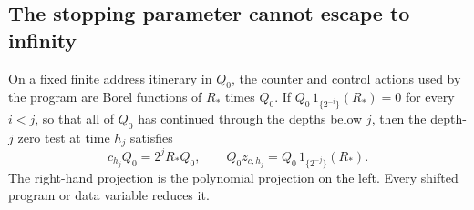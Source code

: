 \subsection{The stopping parameter cannot escape to infinity}\label{sec:stop-forcing}
\begin{lemma}\label{lem:stop-sectors}
On a fixed finite address itinerary in $Q_0$, the counter and control actions used by the program are Borel functions of $R_*$ times $Q_0$. If $Q_0\,1_{\{2^{-i}\}}(R_*)=0$ for every $i<j$, so that all of $Q_0$ has continued through the depths below $j$, then the depth-$j$ zero test at time $h_j$ satisfies
\begin{equation}\label{eq:stop-sector}
 c_{h_j}Q_0=2^jR_*Q_0,\qquad
 Q_0z_{c,h_j}=Q_0\,1_{\{2^{-j}\}}(R_*).
\end{equation}
The right-hand projection is the polynomial projection on the left. Every shifted program or data variable reduces it.
\end{lemma}
